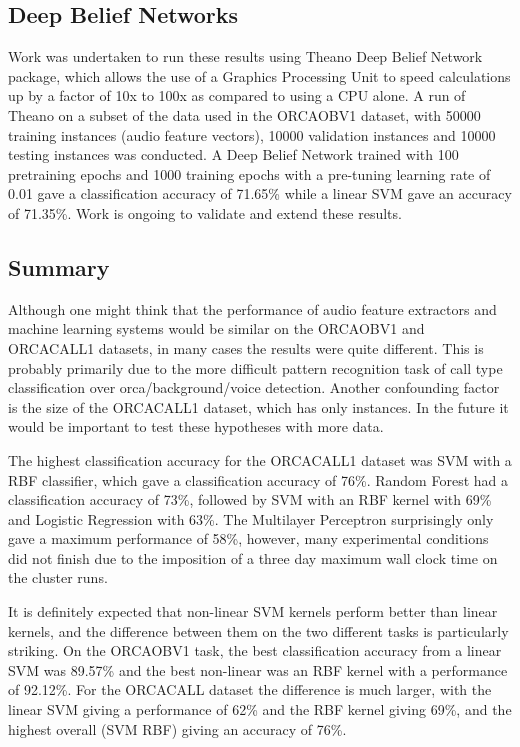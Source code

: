 \documentclass[12pt,oneside]{book}
\begin{document}
\subsection{Deep Belief Networks}

Work was undertaken to run these results using Theano
\cite{bergstra2010theano} Deep Belief Network package, which allows
the use of a Graphics Processing Unit to speed calculations up by a
factor of 10x to 100x as compared to using a CPU alone.  A run of
Theano on a subset of the data used in the ORCAOBV1 dataset, with
50000 training instances (audio feature vectors), 10000 validation
instances and 10000 testing instances was conducted.  A Deep Belief
Network trained with 100 pretraining epochs and 1000 training epochs
with a pre-tuning learning rate of 0.01 gave a classification accuracy
of 71.65\% while a linear SVM gave an accuracy of 71.35\%.  Work is
ongoing to validate and extend these results.


\subsection{Summary}

Although one might think that the performance of audio feature
extractors and machine learning systems would be similar on the
ORCAOBV1 and ORCACALL1 datasets, in many cases the results were quite
different.  This is probably primarily due to the more difficult
pattern recognition task of call type classification over
orca/background/voice detection.  Another confounding factor is the
size of the ORCACALL1 dataset, which has only \totalClipsInORCACALL
instances.  In the future it would be important to test these
hypotheses with more data.

The highest classification accuracy for the ORCACALL1 dataset was SVM
with a RBF classifier, which gave a classification accuracy of 76\%.
Random Forest had a classification accuracy of 73\%, followed by SVM
with an RBF kernel with 69\% and Logistic Regression with 63\%.  The
Multilayer Perceptron surprisingly only gave a maximum performance of
58\%, however, many experimental conditions did not finish due to the
imposition of a three day maximum wall clock time on the cluster runs.

It is definitely expected that non-linear SVM kernels perform better
than linear kernels, and the difference between them on the two
different tasks is particularly striking.  On the ORCAOBV1 task, the
best classification accuracy from a linear SVM was 89.57\% and the
best non-linear was an RBF kernel with a performance of 92.12\%.  For
the ORCACALL dataset the difference is much larger, with the linear
SVM giving a performance of 62\% and the RBF kernel giving 69\%, and
the highest overall (SVM RBF) giving an accuracy of 76\%.
\end{document}

